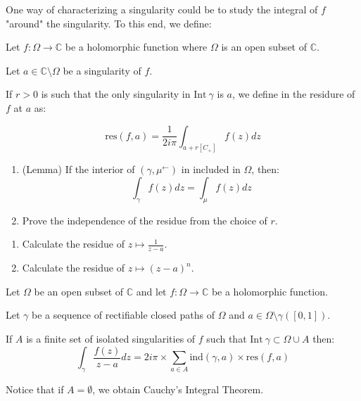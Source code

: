 One way of characterizing a singularity could be to study the integral of $f$ "around" the singularity. To this end, we define:

\begin{defi}
    Let $f: \Omega \rightarrow \mathbb{C}$ be a holomorphic function where $\Omega$ is an open subset of $\mathbb{C}$.

    Let $a\in\mathbb{C}\setminus\Omega$ be a singularity of $f$.

    If $r>0$ is such that the only singularity in $\mathrm{Int}~\gamma$ is $a$, we define in the residure of $f$ at $a$ as:

    $$\mathrm{res}(f, a) = \frac{1}{2i\pi} \int_{a + r[C_+]} f(z)dz$$
\end{defi}

\begin{exo}[$\star$]
    \begin{enumerate}
        \item (Lemma) If the interior of $(\gamma, \mu^\leftarrow)$ in included in $\Omega$, then:
            $$\int_\gamma f(z)dz = \int_\mu f(z)dz$$
        \item Prove the independence of the residue from the choice of $r$.
    \end{enumerate}
\end{exo}

\begin{exo}[$\star$]
    \begin{enumerate}
        \item Calculate the residue of $z \mapsto \frac{1}{z-a}$.
        \item Calculate the residue of $z \mapsto (z-a)^n$.
    \end{enumerate}
\end{exo}

\begin{thm*}
    Let $\Omega$ be an open subset of $\mathbb{C}$ and let $f: \Omega \rightarrow \mathbb{C}$ be a holomorphic function.

    Let $\gamma$ be a sequence of rectifiable closed paths of $\Omega$ and $a\in\Omega\setminus\gamma([0,1])$.

    If $A$ is a finite set of isolated singularities of $f$ such that $\mathrm{Int}~\gamma \subset \Omega \cup A$ then:
    $$\int_\gamma \frac{f(z)}{z-a}dz = 2i\pi \times \sum_{a\in A}\mathrm{ind}(\gamma, a) \times \mathrm{res}(f,a)$$
\end{thm*}

\begin{note}
    Notice that if $A = \emptyset$, we obtain Cauchy's Integral Theorem.
\end{note}

